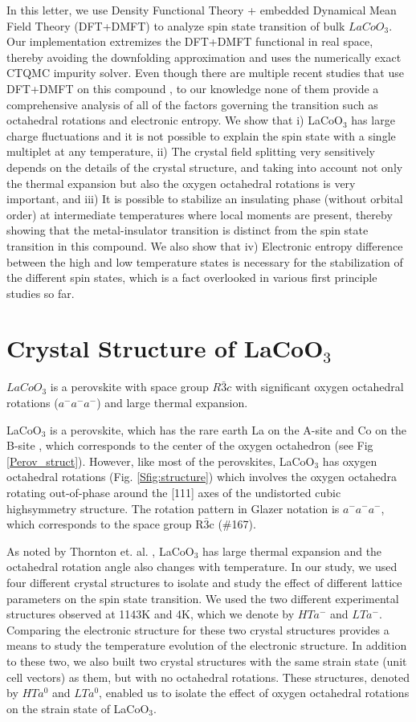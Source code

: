 \documentclass[10pt]{ruthesis}
\begin{document}
{In this letter, we use Density Functional Theory + embedded Dynamical Mean Field Theory (DFT+DMFT)  to analyze spin state transition of bulk $LaCoO_3$.  Our implementation extremizes the DFT+DMFT functional in real space, thereby avoiding the downfolding approximation and uses the numerically exact CTQMC impurity solver\cite{Dmft3,haule}.  Even though there are multiple recent studies that use DFT+DMFT on this compound \cite{craco, Zhang, Kunes_main}, to our knowledge none of them provide a comprehensive analysis of all of the factors governing the transition such as octahedral rotations and electronic entropy. We show that i) LaCoO$_3$ has large charge fluctuations and it is not possible to explain the spin state with a single multiplet at any temperature, ii) The crystal field splitting very sensitively depends on the details of the crystal structure, and taking into account not only the thermal expansion but also the oxygen octahedral rotations is very important, and  iii) It is possible to stabilize an insulating phase (without orbital order) at intermediate temperatures where local moments are present, thereby showing that the metal-insulator transition is distinct from the spin state transition in this compound. We also show that  iv) Electronic entropy difference between the high and low temperature states is necessary for the stabilization of the different spin states, which is a fact overlooked in various first principle studies so far. 


\section{Crystal Structure of LaCoO$_3$}$LaCoO_3$ is a perovskite with space group $R\bar{3}c$ with significant oxygen octahedral rotations ($a^-a^-a^-$) and large thermal expansion. 

LaCoO$_3$ is a perovskite, which has the rare earth La on the A-site and Co on the B-site   , which corresponds to the center of the oxygen octahedron (see Fig \ref{Perov_struct}). However, like most of the perovskites, LaCoO$_3$ has oxygen octahedral rotations (Fig. \ref{Sfig:structure}) which involves the oxygen octahedra rotating out-of-phase around the [111] axes of the undistorted cubic highsymmetry structure. The rotation pattern in Glazer notation is $a^-a^-a^-$, which corresponds to the space group R$\bar 3$c (\#167).

As noted by Thornton et. al. \cite{Thornton}, LaCoO$_3$ has large thermal expansion and the octahedral rotation angle also changes with temperature. In our study, we used four different crystal structures to isolate and study the effect of different lattice parameters on the spin state transition. We used the two different experimental structures observed at 1143K and 4K, which we denote by $HTa^-$ and $LTa^-$. Comparing the electronic structure for these two crystal structures provides a means to study the temperature evolution of the electronic structure. In addition to these two, we also built two crystal structures with the same strain state (unit cell vectors) as them, but with no octahedral rotations. These structures, denoted by $HTa^0$ and $LTa^0$, enabled us to isolate the effect of oxygen octahedral rotations on the strain state of LaCoO$_3$. 

}
\end{document}
